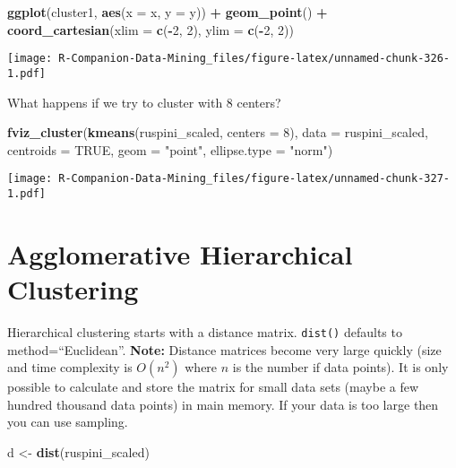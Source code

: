 \documentclass[
  notitlepage]{book}
\newenvironment{Shaded}{\begin{snugshade}}{\end{snugshade}}
\newcommand{\DataTypeTok}[1]{\textcolor[rgb]{0.13,0.29,0.53}{#1}}
\newcommand{\DecValTok}[1]{\textcolor[rgb]{0.00,0.00,0.81}{#1}}
\newcommand{\KeywordTok}[1]{\textcolor[rgb]{0.13,0.29,0.53}{\textbf{#1}}}
\newcommand{\NormalTok}[1]{#1}
\newcommand{\OperatorTok}[1]{\textcolor[rgb]{0.81,0.36,0.00}{\textbf{#1}}}
\newcommand{\OtherTok}[1]{\textcolor[rgb]{0.56,0.35,0.01}{#1}}
\newcommand{\StringTok}[1]{\textcolor[rgb]{0.31,0.60,0.02}{#1}}
\begin{document}
\begin{Shaded}
\begin{Highlighting}[]
\KeywordTok{ggplot}\NormalTok{(cluster1, }\KeywordTok{aes}\NormalTok{(}\DataTypeTok{x =}\NormalTok{ x, }\DataTypeTok{y =}\NormalTok{ y)) }\OperatorTok{+}\StringTok{ }\KeywordTok{geom\_point}\NormalTok{() }\OperatorTok{+}
\StringTok{  }\KeywordTok{coord\_cartesian}\NormalTok{(}\DataTypeTok{xlim =} \KeywordTok{c}\NormalTok{(}\OperatorTok{{-}}\DecValTok{2}\NormalTok{, }\DecValTok{2}\NormalTok{), }\DataTypeTok{ylim =} \KeywordTok{c}\NormalTok{(}\OperatorTok{{-}}\DecValTok{2}\NormalTok{, }\DecValTok{2}\NormalTok{))}
\end{Highlighting}
\end{Shaded}

\texttt{[image: R-Companion-Data-Mining\_files/figure-latex/unnamed-chunk-326-1.pdf]}

What happens if we try to cluster with 8 centers?

\begin{Shaded}
\begin{Highlighting}[]
\KeywordTok{fviz\_cluster}\NormalTok{(}\KeywordTok{kmeans}\NormalTok{(ruspini\_scaled, }\DataTypeTok{centers =} \DecValTok{8}\NormalTok{), }\DataTypeTok{data =}\NormalTok{ ruspini\_scaled,}
  \DataTypeTok{centroids =} \OtherTok{TRUE}\NormalTok{,  }\DataTypeTok{geom =} \StringTok{"point"}\NormalTok{, }\DataTypeTok{ellipse.type =} \StringTok{"norm"}\NormalTok{)}
\end{Highlighting}
\end{Shaded}

\texttt{[image: R-Companion-Data-Mining\_files/figure-latex/unnamed-chunk-327-1.pdf]}

\hypertarget{agglomerative-hierarchical-clustering}{%
\section{Agglomerative Hierarchical Clustering}\label{agglomerative-hierarchical-clustering}}

Hierarchical clustering starts with a distance matrix. \texttt{dist()} defaults
to method=``Euclidean''. \textbf{Note:} Distance matrices become very large
quickly (size and time complexity is \(O(n^2)\) where \(n\) is the number if
data points). It is only possible to calculate and store the matrix for
small data sets (maybe a few hundred thousand data points) in main
memory. If your data is too large then you can use sampling.

\begin{Shaded}
\begin{Highlighting}[]
\NormalTok{d \textless{}{-}}\StringTok{ }\KeywordTok{dist}\NormalTok{(ruspini\_scaled)}
\end{Highlighting}
\end{Shaded}
\end{document}
